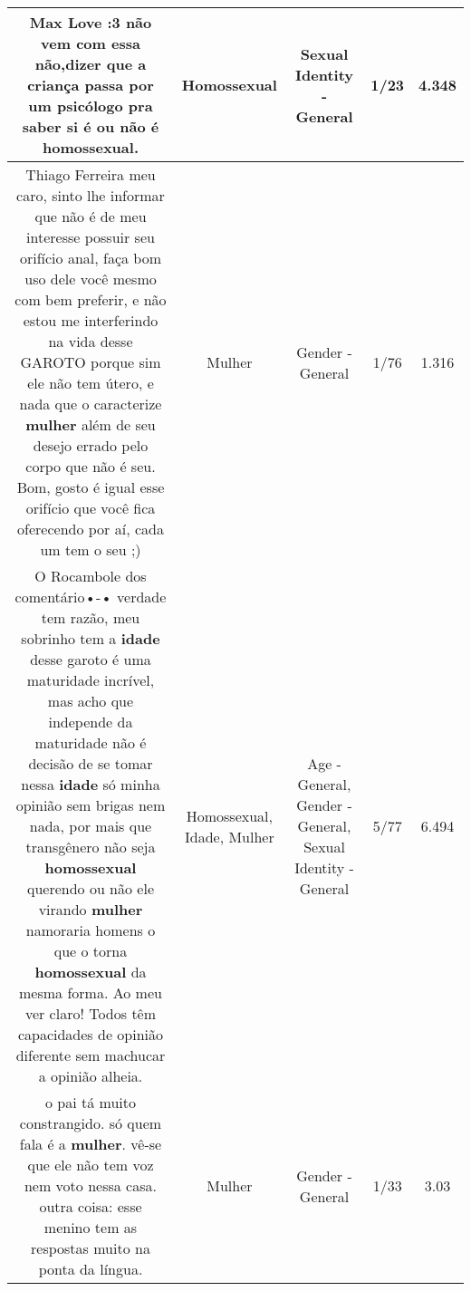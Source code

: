 \documentclass[11pt]{article}
\newlength\mylength
\begin{document}
\begin{center}
\begin{longtable}{|C{.65\mylength}|C{.30\mylength}|C{.12\mylength}|C{.12\mylength}|C{.12\mylength}|}
  \small Max Love :3 não vem com essa não,dizer que a criança passa por um psicólogo pra saber si é ou não é \textbf{homossexual}.\normalsize   & Homossexual & Sexual Identity - General & 1/23 & 4.348 \\  \hline
  \small Thiago Ferreira meu caro, sinto lhe informar que não é de meu interesse possuir seu orifício anal, faça bom uso dele você mesmo com bem preferir, e não estou me interferindo na vida desse GAROTO porque sim ele não tem útero, e nada que o caracterize \textbf{mulher} além de seu desejo errado pelo corpo que não é seu. Bom, gosto é igual esse orifício que você fica oferecendo por aí, cada um tem o seu ;)\normalsize   & Mulher & Gender - General & 1/76 & 1.316 \\  \hline
  \small O Rocambole dos comentário•-• verdade tem razão, meu sobrinho tem a \textbf{idade} desse garoto é uma maturidade incrível, mas acho que independe da maturidade não é decisão de se tomar nessa \textbf{idade} só minha opinião sem brigas nem nada, por mais que transgênero não seja \textbf{homossexual} querendo ou não ele virando \textbf{mulher} namoraria homens o que o torna \textbf{homossexual} da mesma forma. Ao meu ver claro! Todos têm capacidades de opinião diferente sem machucar a opinião alheia.\normalsize   & Homossexual, Idade, Mulher & Age - General, Gender - General, Sexual Identity - General & 5/77 & 6.494 \\  \hline
  \small o pai tá muito constrangido. só quem fala é a \textbf{mulher}. vê-se que ele não tem voz nem voto nessa casa. outra coisa: esse menino tem as respostas muito na ponta da língua.\normalsize   & Mulher & Gender - General & 1/33 & 3.03 \\  \hline

\end{longtable}
\end{center}
\end{document}
